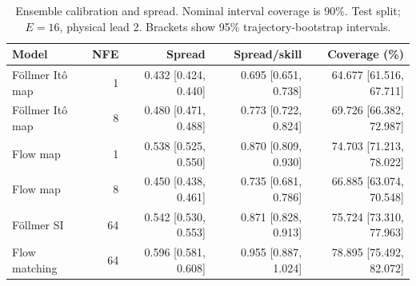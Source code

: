 \begin{table}[t]
\centering
\small
\setlength{\tabcolsep}{3pt}
\caption{Ensemble calibration and spread. Nominal interval coverage is 90\%. Test split; $E=16$, physical lead 2. Brackets show 95\% trajectory-bootstrap intervals.}
\label{tab:map-calibration}
\begin{tabular}{lrrrr}
\toprule
Model & NFE & Spread & Spread/skill & Coverage (\%) \\
\midrule
Föllmer Itô map & 1 & 0.432 [0.424, 0.440] & 0.695 [0.651, 0.738] & 64.677 [61.516, 67.711] \\
Föllmer Itô map & 8 & 0.480 [0.471, 0.488] & 0.773 [0.722, 0.824] & 69.726 [66.382, 72.987] \\
\addlinespace
Flow map & 1 & 0.538 [0.525, 0.550] & 0.870 [0.809, 0.930] & 74.703 [71.213, 78.022] \\
Flow map & 8 & 0.450 [0.438, 0.461] & 0.735 [0.681, 0.786] & 66.885 [63.074, 70.548] \\
\addlinespace
Föllmer SI & 64 & 0.542 [0.530, 0.553] & 0.871 [0.828, 0.913] & 75.724 [73.310, 77.963] \\
\addlinespace
Flow matching & 64 & 0.596 [0.581, 0.608] & 0.955 [0.887, 1.024] & 78.895 [75.492, 82.072] \\
\bottomrule
\end{tabular}
\end{table}

